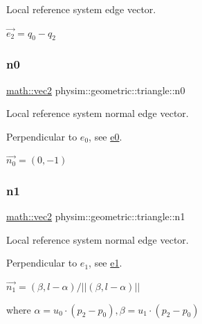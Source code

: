 Local reference system edge vector. 

$\vec{e_2} = q_0 - q_2$ \mbox{\label{classphysim_1_1geometric_1_1triangle_a90cd098fb3959fbc0c7ef29673991131}} 
\subsubsection{\texorpdfstring{n0}{n0}}
{\footnotesize\ttfamily \hyperlink{structphysim_1_1math_1_1vec2}{math\+::vec2} physim\+::geometric\+::triangle\+::n0\hspace{0.3cm}{\ttfamily [private]}}



Local reference system normal edge vector. 

Perpendicular to $e_0$, see \hyperlink{classphysim_1_1geometric_1_1triangle_a5e9f0e86dc34f816805f161ce8e7ddf8}{e0}.

$\vec{n_0} = (0,-1)$ \mbox{\label{classphysim_1_1geometric_1_1triangle_a4280d8774bd8e283645b6251874c2bb2}} 
\subsubsection{\texorpdfstring{n1}{n1}}
{\footnotesize\ttfamily \hyperlink{structphysim_1_1math_1_1vec2}{math\+::vec2} physim\+::geometric\+::triangle\+::n1\hspace{0.3cm}{\ttfamily [private]}}



Local reference system normal edge vector. 

Perpendicular to $e_1$, see \hyperlink{classphysim_1_1geometric_1_1triangle_a729f755d23297af20de950d99552859a}{e1}.

$\vec{n_1} = (\beta, l - \alpha)/ || (\beta, l - \alpha) || $

where $\alpha = u_0\cdot(p_2-p_0), \beta = u_1\cdot(p_2-p_0)$ \mbox{\label{classphysim_1_1geometric_1_1triangle_ae50e06030752185f79700b3a4b67e6de}} 
